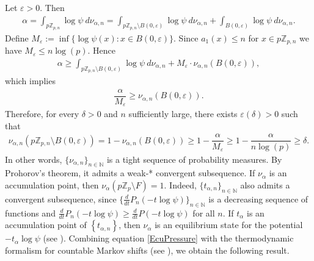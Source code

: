 \documentclass[11pt]{amsart}
\theoremstyle{remark}
\numberwithin{equation}{section}
\newcommand{\N}{\mathbb{N}}
\newcommand{\Z}{\mathbb{Z}}
\begin{document}
Let $\varepsilon>0$. Then
\begin{align*}
    \alpha=\int_{p\Z_{p,n}}\log \psi \  d\nu_{\alpha,n}=\int_{p\Z_{p,n}\setminus B(0,\varepsilon)}\log\psi \ d\nu_{\alpha,n}+\int_{B(0,\varepsilon)}\log\psi \ d\nu_{\alpha,n}.
\end{align*} Define $M_{\varepsilon}:=\inf\{\log\psi(x):x\in B(0,\varepsilon)\}$. Since $a_1(x)\leq n$ for $x\in p\Z_{p,n}$ we have $M_\varepsilon\leq n\log(p).$ Hence
\begin{align*}
    \alpha \geq \int_{p\Z_{p,n}\setminus B(0,\varepsilon)}\log \psi \ d\nu_{\alpha,n}+M_{\varepsilon}\cdot \nu_{\alpha,n}(B(0,\varepsilon)),
\end{align*}which implies 
\begin{align*}
    \dfrac{\alpha}{M_{\varepsilon}}\geq \nu_{\alpha,n}(B(0,\varepsilon)).
\end{align*}Therefore, for every $\delta>0$ and $n$ sufficiently large, there exists $\varepsilon(\delta)>0$ such that 
\begin{align*}
    \nu_{\alpha,n}\left(p\Z_{p,n}\setminus B(0,\varepsilon)\right)=1- \nu_{\alpha,n}(B(0,\varepsilon))\geq 1-\dfrac{\alpha}{M_{\varepsilon}}\geq 1-\dfrac{\alpha}{n\log(p)}\geq \delta.
\end{align*}In other words, $\{\nu_{\alpha,n}\}_{n\in \N}$ is a tight sequence of probability measures. By Prohorov's theorem, it admits a weak-* convergent subsequence. If $\nu_{\alpha}$ is an accumulation point, then $\nu_{\alpha}(p\Z_{p}\setminus F)=1$. Indeed, $\{t_{\alpha,n}\}_{n\in \N}$ also admits a convergent subsequence, since $\{\frac{d}{dt}P_{n}(-t\log \psi)\}_{n\in \N}$ is a decreasing sequence of functions and $\frac{d}{dt}P_{n}(-t\log \psi)\geq \frac{d}{dt}P(-t\log \psi )$ for all $n$.
If $t_{\alpha}$ is an accumulation point of $\left\{ t_{\alpha,n} \right\}$, then $\nu_{\alpha}$ is an equilibrium state for the potential $-t_{\alpha}\log \psi $ (see \cite[section 6]{io}).
Combining equation  \eqref{EcuPressure} with the thermodynamic formalism for countable Markov shifts (see \cite{sa2}), we obtain the following result.
\end{document}
